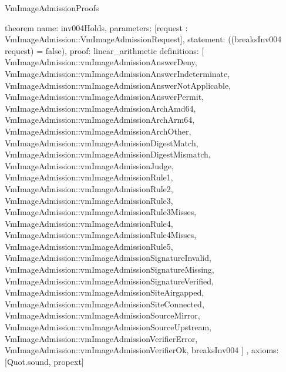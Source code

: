 \begin{lexlean}{VmImageAdmissionProofs}
\begin{semanticmodule}
theorem{
  name: inv004Holds,
  parameters: [request : VmImageAdmission::VmImageAdmissionRequest],
  statement: ((breaksInv004 request) = false),
  proof: linear_arithmetic{
    definitions: [
      VmImageAdmission::vmImageAdmissionAnswerDeny,
      VmImageAdmission::vmImageAdmissionAnswerIndeterminate,
      VmImageAdmission::vmImageAdmissionAnswerNotApplicable,
      VmImageAdmission::vmImageAdmissionAnswerPermit,
      VmImageAdmission::vmImageAdmissionArchAmd64,
      VmImageAdmission::vmImageAdmissionArchArm64,
      VmImageAdmission::vmImageAdmissionArchOther,
      VmImageAdmission::vmImageAdmissionDigestMatch,
      VmImageAdmission::vmImageAdmissionDigestMismatch,
      VmImageAdmission::vmImageAdmissionJudge,
      VmImageAdmission::vmImageAdmissionRule1,
      VmImageAdmission::vmImageAdmissionRule2,
      VmImageAdmission::vmImageAdmissionRule3,
      VmImageAdmission::vmImageAdmissionRule3Misses,
      VmImageAdmission::vmImageAdmissionRule4,
      VmImageAdmission::vmImageAdmissionRule4Misses,
      VmImageAdmission::vmImageAdmissionRule5,
      VmImageAdmission::vmImageAdmissionSignatureInvalid,
      VmImageAdmission::vmImageAdmissionSignatureMissing,
      VmImageAdmission::vmImageAdmissionSignatureVerified,
      VmImageAdmission::vmImageAdmissionSiteAirgapped,
      VmImageAdmission::vmImageAdmissionSiteConnected,
      VmImageAdmission::vmImageAdmissionSourceMirror,
      VmImageAdmission::vmImageAdmissionSourceUpstream,
      VmImageAdmission::vmImageAdmissionVerifierError,
      VmImageAdmission::vmImageAdmissionVerifierOk,
      breaksInv004
    ]
  },
  axioms: [Quot.sound, propext]
}
\end{semanticmodule}
\end{lexlean}
